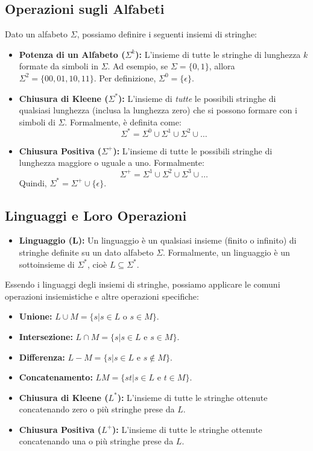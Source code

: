\documentclass[a4paper, 11pt]{article}
\begin{document}
\subsection{Operazioni sugli Alfabeti}
Dato un alfabeto $\Sigma$, possiamo definire i seguenti insiemi di stringhe:
\begin{itemize}
    \item \textbf{Potenza di un Alfabeto ($\Sigma^k$):} L'insieme di tutte le stringhe di lunghezza $k$ formate da simboli in $\Sigma$. Ad esempio, se $\Sigma = \{0, 1\}$, allora $\Sigma^2 = \{00, 01, 10, 11\}$. Per definizione, $\Sigma^0 = \{\epsilon\}$.
    \item \textbf{Chiusura di Kleene ($\Sigma^*$):} L'insieme di \textit{tutte} le possibili stringhe di qualsiasi lunghezza (inclusa la lunghezza zero) che si possono formare con i simboli di $\Sigma$. Formalmente, è definita come:
    \[ \Sigma^* = \Sigma^0 \cup \Sigma^1 \cup \Sigma^2 \cup \dots \]
    \item \textbf{Chiusura Positiva ($\Sigma^+$):} L'insieme di tutte le possibili stringhe di lunghezza maggiore o uguale a uno. Formalmente:
    \[ \Sigma^+ = \Sigma^1 \cup \Sigma^2 \cup \Sigma^3 \cup \dots \]
    Quindi, $\Sigma^* = \Sigma^+ \cup \{\epsilon\}$.
\end{itemize}

\subsection{Linguaggi e Loro Operazioni}
\begin{itemize}
    \item \textbf{Linguaggio (L):} Un linguaggio è un qualsiasi insieme (finito o infinito) di stringhe definite su un dato alfabeto $\Sigma$. Formalmente, un linguaggio è un sottoinsieme di $\Sigma^*$, cioè $L \subseteq \Sigma^*$.
\end{itemize}

Essendo i linguaggi degli insiemi di stringhe, possiamo applicare le comuni operazioni insiemistiche e altre operazioni specifiche:
\begin{itemize}
    \item \textbf{Unione:} $L \cup M = \{s | s \in L \text{ o } s \in M\}$.
    \item \textbf{Intersezione:} $L \cap M = \{s | s \in L \text{ e } s \in M\}$.
    \item \textbf{Differenza:} $L - M = \{s | s \in L \text{ e } s \notin M\}$.
    \item \textbf{Concatenamento:} $LM = \{st | s \in L \text{ e } t \in M\}$.
    \item \textbf{Chiusura di Kleene ($L^*$):} L'insieme di tutte le stringhe ottenute concatenando zero o più stringhe prese da $L$.
    \item \textbf{Chiusura Positiva ($L^+$):} L'insieme di tutte le stringhe ottenute concatenando una o più stringhe prese da $L$.
\end{itemize}
\end{document}
